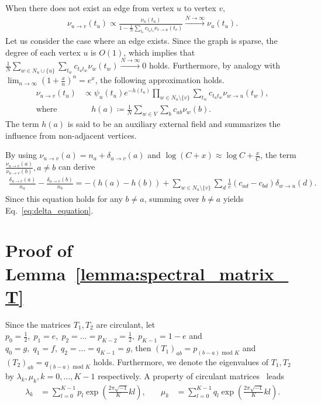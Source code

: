 \documentclass{article}
\theoremstyle{plain}
\begin{document}
When there does not exist an edge from vertex $u$ to vertex $v$,
\begin{align*}
	\nu_{u\to v}(t_u) \propto \frac{\nu_u(t_u)}{1 - \frac{1}{N} \sum_{t_v} c_{t_u t_v} \nu_{v\to u}(t_v)}
	\xrightarrow{N\to\infty} \nu_u(t_u)
	.
\end{align*}
Let us consider the case where an edge exists. Since the graph is sparse, the degree of each vertex $u$ is $O(1)$, which implies that $\frac{1}{N} \sum_{w\in N_u \cup \{ u \}} \sum_{t_w} c_{t_u t_w} \nu_w(t_w) \xrightarrow{N\to\infty} 0$ holds.
Furthermore, by analogy with $\lim_{n\to\infty} (1+\frac{x}{n})^n = e^x$, the following approximation holds.
\begin{align}
	\nu_{u\to v}(t_u) & \propto \psi_u(t_u) e^{-h(t_u)} \prod_{w\in N_u \setminus \{ v \}} \sum_{t_w} c_{t_u t_w} \nu_{w\to u}(t_w)
	,                                                                                                                               \label{eq:adjacent_message} \\
	\text{where}      & \quad h(a) \coloneqq \frac{1}{N} \sum_{w\in V} \sum_{b} c_{ab} \nu_{w}(b)
	.
\end{align}
The term $h(a)$ is said to be an auxiliary external field and summarizes the influence from non-adjacent vertices.

By using $\nu_{u\to v}(a) = n_a + \delta_{u\to v}(a)$ and $\log(C + x) \approx \log C + \frac{x}{C}$, the term $\frac{\nu_{u\to v}(a)}{\nu_{u\to v}(b)}, a\neq b$ can derive
\begin{align*}
	\frac{\delta_{u\to v}(a)}{n_a} - \frac{\delta_{u\to v}(b)}{n_b} =
	- (h(a) - h(b)) + \sum_{w\in N_u \setminus \{ v \}} \sum_{d} \frac{1}{c}(c_{a d} - c_{b d}) \delta_{w\to u}(d)
	.
\end{align*}
Since this equation holds for any $b\neq a$, summing over $b\neq a$ yields Eq.~\eqref{eq:delta_equation}.

\section{Proof of Lemma~\ref{lemma:spectral_matrix_T}}

Since the matrices $T_1, T_2$ are circulant, let $p_0 = \frac{1}{2},\; p_1 = e,\; p_2 = \dots = p_{K-2} = \frac{1}{2},\; p_{K-1} = 1-e$ and $q_0 = g,\; q_1 = f,\; q_2 = \dots = q_{K-1} = g$, then $(T_1)_{ab} = p_{(b-a) \text{ mod } K}$ and $(T_2)_{ab} = q_{(b-a) \text{ mod } K}$ holds.
Furthermore, we denote the eigenvalues of $T_1, T_2$ by $\lambda_k, \mu_k, k=0,\dots, K-1$ respectively. A property of circulant matrices~\citep{Gray2005-ne} leads
\begin{align*}
	\lambda_k & = \sum_{l=0}^{K-1} p_l \exp\left( \frac{2\pi \sqrt{-1}}{K} kl \right)
	,         & \quad
	\mu_k     & = \sum_{l=0}^{K-1} q_l \exp\left( \frac{2\pi \sqrt{-1}}{K} kl \right)
	.
\end{align*}
\end{document}
